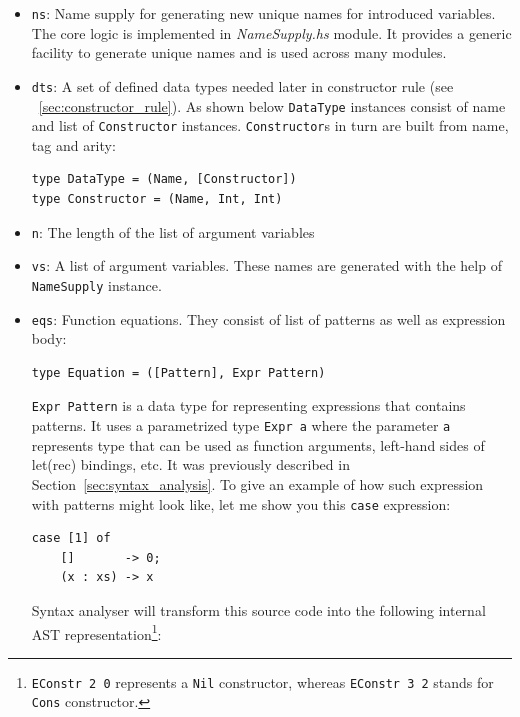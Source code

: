 \documentclass[12pt,a4paper]{report}
\begin{document}
\begin{itemize}
  \item \texttt{ns}: Name supply for generating new unique names for
    introduced variables. The core logic is implemented in
    \textit{NameSupply.hs} module. It provides a generic facility to generate
    unique names and is used across many modules.
  \item \texttt{dts}: A set of defined data types needed later in constructor
    rule (see ~\ref{sec:constructor_rule}). As shown below \texttt{DataType}
    instances consist of name and list of \texttt{Constructor} instances.
    \texttt{Constructor}s in turn are built from name, tag and arity:

\vspace*{0.2in}
\begin{lstlisting}[style=haskell]
type DataType = (Name, [Constructor])
type Constructor = (Name, Int, Int)
\end{lstlisting}

  \item \texttt{n}: The length of the list of argument variables
  \item \texttt{vs}: A list of argument variables. These names are generated
    with the help of \texttt{NameSupply} instance.
  \item \texttt{eqs}: Function equations. They consist of list of patterns as
    well as expression body:

\vspace*{0.2in}
\begin{lstlisting}[style=haskell]
type Equation = ([Pattern], Expr Pattern)
\end{lstlisting}
\texttt{Expr Pattern} is a data type for representing expressions that contains
patterns. It uses a parametrized type \texttt{Expr a} where the parameter
\texttt{a} represents type that can be used as function arguments, left-hand
sides of let(rec) bindings, etc. It was previously described in
Section~\ref{sec:syntax_analysis}.
To give an example of how such expression with patterns might look like, let me
show you this \texttt{case} expression:

\vspace*{0.2in}
\begin{lstlisting}[style=haskell]
case [1] of
    []       -> 0;
    (x : xs) -> x
\end{lstlisting}
Syntax analyser will transform this source code into the following internal AST
representation\footnote{\texttt{EConstr 2 0} represents a \texttt{Nil}
constructor, whereas \texttt{EConstr 3 2} stands for \texttt{Cons} constructor.}:


\end{itemize}
\end{document}
